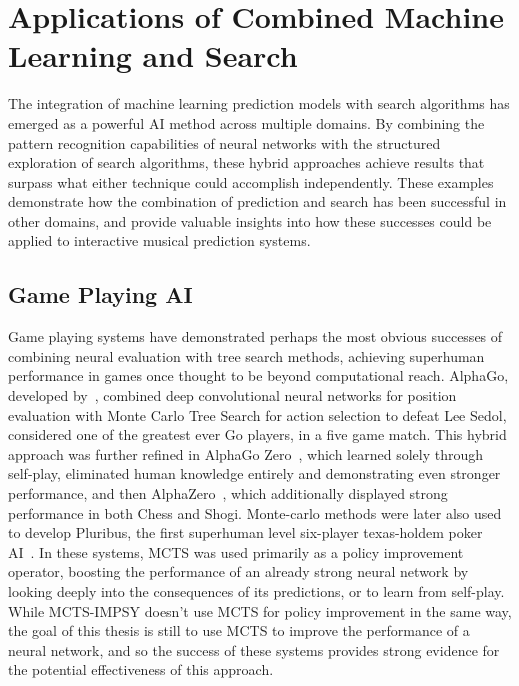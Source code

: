 \section{Applications of Combined Machine Learning and Search}
The integration of machine learning prediction models with search algorithms has emerged as a powerful AI method across multiple domains. By combining the pattern recognition capabilities of neural networks with the structured exploration of search algorithms, these hybrid approaches achieve results that surpass what either technique could accomplish independently. These examples demonstrate how the combination of prediction and search has been successful in other domains, and provide valuable insights into how these successes could be applied to interactive musical prediction systems.

\subsection{Game Playing AI}
Game playing systems have demonstrated perhaps the most obvious successes of combining neural evaluation with tree search methods, achieving superhuman performance in games once thought to be beyond computational reach. AlphaGo, developed by~\cite{Silver2016AlphaGo}, combined deep convolutional neural networks for position evaluation with Monte Carlo Tree Search for action selection to defeat Lee Sedol, considered one of the greatest ever Go players, in a five game match. This hybrid approach was further refined in AlphaGo Zero~\citep{Silver2017AlphaGoZero}, which learned solely through self-play, eliminated human knowledge entirely and demonstrating even stronger performance, and then AlphaZero~\citep{Silver2018AlphaZero}, which additionally displayed strong performance in both Chess and Shogi. Monte-carlo methods were later also used to develop Pluribus, the first superhuman level six-player texas-holdem poker AI~\citep{Brown2019Pluribus}. In these systems, MCTS was used primarily as a policy improvement operator, boosting the performance of an already strong neural network by looking deeply into the consequences of its predictions, or to learn from self-play. While MCTS-IMPSY doesn't use MCTS for policy improvement in the same way, the goal of this thesis is still to use MCTS to improve the performance of a neural network, and so the success of these systems provides strong evidence for the potential effectiveness of this approach.

